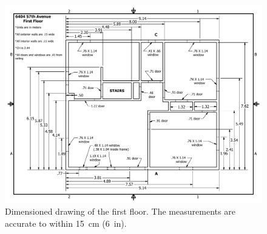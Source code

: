 \documentclass[12pt,oneside]{book}
\begin{document}
\begin{figure}[!ht]
\centering
\includegraphics[width=1\textwidth]{../Figures/First_Floor_Metric}
\caption[Dimensioned drawing of second floor.]{Dimensioned drawing of the first floor. The measurements are accurate to within 15~cm (6~in).}
\label{fig:first_floor}
\end{figure}
\end{document}
